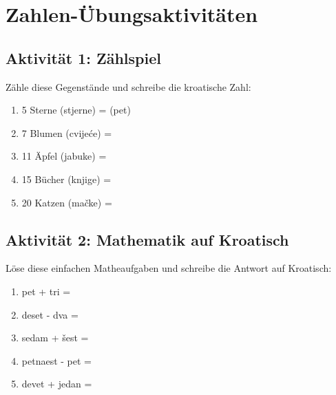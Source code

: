 \section{Zahlen-Übungsaktivitäten}

\begin{exercise}
\subsection*{Aktivität 1: Zählspiel}

Zähle diese Gegenstände und schreibe die kroatische Zahl:

\begin{enumerate}
    \item 5 Sterne (stjerne) = \underline{\hspace{3cm}} (pet)
    \item 7 Blumen (cvijeće) = \underline{\hspace{3cm}}
    \item 11 Äpfel (jabuke) = \underline{\hspace{3cm}}
    \item 15 Bücher (knjige) = \underline{\hspace{3cm}}
    \item 20 Katzen (mačke) = \underline{\hspace{3cm}}
\end{enumerate}

\subsection*{Aktivität 2: Mathematik auf Kroatisch}

Löse diese einfachen Matheaufgaben und schreibe die Antwort auf Kroatisch:

\begin{enumerate}
    \item pet + tri = \underline{\hspace{3cm}}
    \item deset - dva = \underline{\hspace{3cm}}
    \item sedam + šest = \underline{\hspace{3cm}}
    \item petnaest - pet = \underline{\hspace{3cm}}
    \item devet + jedan = \underline{\hspace{3cm}}
\end{enumerate}


\end{exercise}
